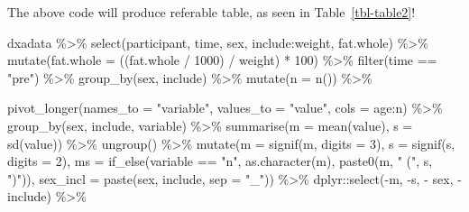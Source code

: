 \documentclass[
  11pt,
  letterpaper,
]{scrbook}
\newenvironment{Shaded}{\begin{snugshade}}{\end{snugshade}}
\newcommand{\AttributeTok}[1]{\textcolor[rgb]{0.40,0.45,0.13}{#1}}
\newcommand{\DecValTok}[1]{\textcolor[rgb]{0.68,0.00,0.00}{#1}}
\newcommand{\FunctionTok}[1]{\textcolor[rgb]{0.28,0.35,0.67}{#1}}
\newcommand{\NormalTok}[1]{\textcolor[rgb]{0.00,0.23,0.31}{#1}}
\newcommand{\SpecialCharTok}[1]{\textcolor[rgb]{0.37,0.37,0.37}{#1}}
\newcommand{\StringTok}[1]{\textcolor[rgb]{0.13,0.47,0.30}{#1}}
\begin{document}
The above code will produce referable table, as seen in
Table~\ref{tbl-table2}!

\begin{Shaded}
\begin{Highlighting}[numbers=left,,]
\NormalTok{  dxadata }\SpecialCharTok{\%\textgreater{}\%}
  \FunctionTok{select}\NormalTok{(participant, time, sex, include}\SpecialCharTok{:}\NormalTok{weight, fat.whole) }\SpecialCharTok{\%\textgreater{}\%}
  \FunctionTok{mutate}\NormalTok{(}\AttributeTok{fat.whole =}\NormalTok{ ((fat.whole }\SpecialCharTok{/} \DecValTok{1000}\NormalTok{) }\SpecialCharTok{/}\NormalTok{ weight) }\SpecialCharTok{*} \DecValTok{100}\NormalTok{) }\SpecialCharTok{\%\textgreater{}\%}
  \FunctionTok{filter}\NormalTok{(time }\SpecialCharTok{==} \StringTok{"pre"}\NormalTok{) }\SpecialCharTok{\%\textgreater{}\%}
  \FunctionTok{group\_by}\NormalTok{(sex, include) }\SpecialCharTok{\%\textgreater{}\%}
  \FunctionTok{mutate}\NormalTok{(}\AttributeTok{n =} \FunctionTok{n}\NormalTok{()) }\SpecialCharTok{\%\textgreater{}\%}

  \FunctionTok{pivot\_longer}\NormalTok{(}\AttributeTok{names\_to =}  \StringTok{"variable"}\NormalTok{, }
               \AttributeTok{values\_to =} \StringTok{"value"}\NormalTok{, }
               \AttributeTok{cols =}\NormalTok{ age}\SpecialCharTok{:}\NormalTok{n) }\SpecialCharTok{\%\textgreater{}\%}
  \FunctionTok{group\_by}\NormalTok{(sex, include, variable) }\SpecialCharTok{\%\textgreater{}\%}
  \FunctionTok{summarise}\NormalTok{(}\AttributeTok{m =} \FunctionTok{mean}\NormalTok{(value), }
            \AttributeTok{s =} \FunctionTok{sd}\NormalTok{(value)) }\SpecialCharTok{\%\textgreater{}\%}
  \FunctionTok{ungroup}\NormalTok{() }\SpecialCharTok{\%\textgreater{}\%}
  \FunctionTok{mutate}\NormalTok{(}\AttributeTok{m =} \FunctionTok{signif}\NormalTok{(m, }\AttributeTok{digits =} \DecValTok{3}\NormalTok{), }
         \AttributeTok{s =} \FunctionTok{signif}\NormalTok{(s, }\AttributeTok{digits =} \DecValTok{2}\NormalTok{), }
         \AttributeTok{ms =} \FunctionTok{if\_else}\NormalTok{(variable }\SpecialCharTok{==} \StringTok{"n"}\NormalTok{, }\FunctionTok{as.character}\NormalTok{(m), }\FunctionTok{paste0}\NormalTok{(m, }\StringTok{" ("}\NormalTok{, s, }\StringTok{")"}\NormalTok{)), }
         \AttributeTok{sex\_incl =} \FunctionTok{paste}\NormalTok{(sex, include, }\AttributeTok{sep =} \StringTok{"\_"}\NormalTok{)) }\SpecialCharTok{\%\textgreater{}\%}
\NormalTok{  dplyr}\SpecialCharTok{::}\FunctionTok{select}\NormalTok{(}\SpecialCharTok{{-}}\NormalTok{m, }\SpecialCharTok{{-}}\NormalTok{s, }\SpecialCharTok{{-}}\NormalTok{ sex, }\SpecialCharTok{{-}}\NormalTok{include) }\SpecialCharTok{\%\textgreater{}\%}


\end{Highlighting}
\end{Shaded}
\end{document}
